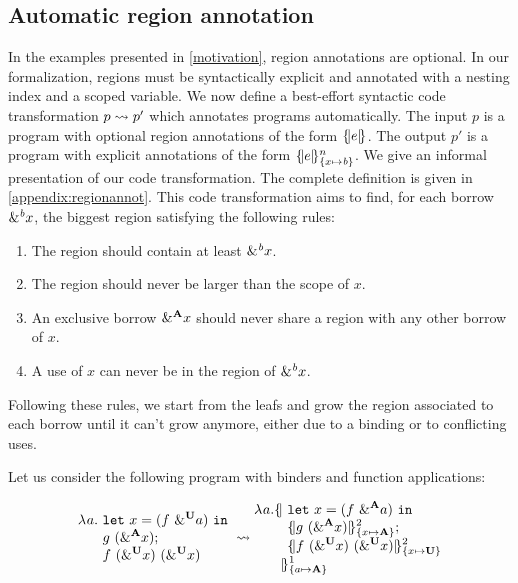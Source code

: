 
\subsection{Automatic region annotation}
\label{regionannot}

In the examples presented in \cref{motivation}, region annotations are optional.
In our formalization, regions must be syntactically explicit and annotated with
a nesting index and a scoped variable.
We now define a best-effort
syntactic code transformation $\RannotT{p}{p'}$ which
annotates programs automatically.
The input $p$ is a program with optional region annotations of the form $\region[]{}{e}$.
The output $p'$ is a program with explicit annotations
of the form $\region{\Sone x\BORROW}{e}$.
We give an informal presentation of our code transformation. The complete
definition is given in \cref{appendix:regionannot}. This code transformation
aims to find, for each borrow $\borrow{x}$, the biggest region satisfying
the following rules:
\begin{enumerate}
\item The region should contain at least $\borrow{x}$.
\item The region should never be larger than the scope of $x$.
\item An exclusive borrow $\borrow[\kaff]{x}$ should never share a region with any other borrow of $x$.
\item A use of $x$ can never be in the region of $\borrow{x}$.
\end{enumerate}
Following these rules, we start from the leafs and grow the region
associated to each borrow until it can't grow anymore, either due to a binding
or to conflicting uses.

Let us consider the following program with binders and function applications:

\[
  \setlength{\jot}{-1pt}
  \RannotT{
\begin{aligned}
  \lam{a}{}\ &
  \letin{x}{\app{f}{\borrow[\kun]{a}}}{}\\
  &g\ (\borrow[\kaff]{x});\\
  &f\ (\borrow[\kun]{x})\ (\borrow[\kun]{x})\\
\end{aligned}
}{
\begin{aligned}
  \lam{a}{}\region[1]{\Sone a\MBORROW}{\ &%
  \letin{x}{\app{f}{\borrow[\kaff]{a}}}{}\\
  &\region[2]{\Sone x\MBORROW}{g\ (\borrow[\kaff]{x})};\\
  &\region[2]{\Sone x\IBORROW}{f\ (\borrow[\kun]{x})\ (\borrow[\kun]{x})}\\
  &\!\!\!}
\end{aligned}
}
\]

